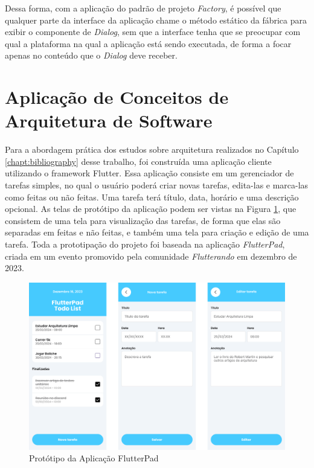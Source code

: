 \documentclass[12pt, %
openright, 
oneside, %
a4paper,    %
brazil]{facom-ufu-abntex2}
\begin{document}
Dessa forma, com a aplicação do padrão de projeto \textit{Factory}, é possível que qualquer parte da interface da aplicação chame o método estático da fábrica para exibir o componente de \textit{Dialog}, sem que a interface tenha que se preocupar com qual a plataforma na qual a aplicação está sendo executada, de forma a focar apenas no conteúdo que o \textit{Dialog} deve receber.

\section{Aplicação de Conceitos de Arquitetura de Software} \label{sec:arch}

Para a abordagem prática dos estudos sobre arquitetura realizados no Capítulo \ref{chapt:bibliography} desse trabalho, foi construída uma aplicação cliente utilizando o framework Flutter. Essa aplicação consiste em um gerenciador de tarefas simples, no qual o usuário poderá criar novas tarefas, edita-las e marca-las como feitas ou não feitas. Uma tarefa terá título, data, horário e uma descrição opcional. As telas de protótipo da aplicação podem ser vistas na Figura \ref{fig:flutterpad_figma}, que consistem de uma tela para visualização das tarefas, de forma que elas são separadas em feitas e não feitas, e também uma tela para criação e edição de uma tarefa. Toda a prototipação do projeto foi baseada na aplicação \textit{FlutterPad}, criada em um evento promovido pela comunidade \textit{Flutterando} em dezembro de 2023.

\begin{figure}[ht]
    \centering
    \includegraphics[width=.85\textwidth]{figures/arch/flutterpad_figma.png}
    \caption{Protótipo da Aplicação FlutterPad}
    \label{fig:flutterpad_figma}
\end{figure}
\end{document}
